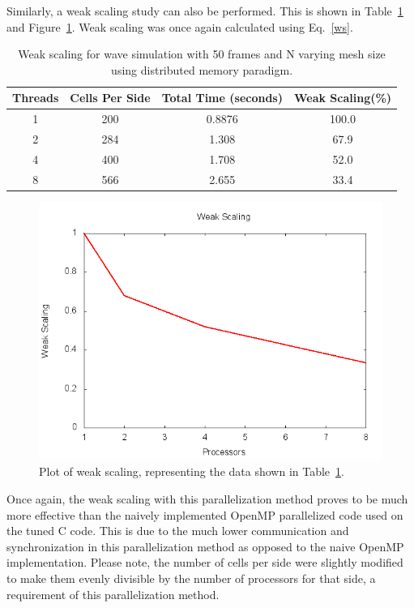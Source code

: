 \documentclass[12pt]{article}
\begin{document}
Similarly, a weak scaling study can also be performed. This is shown in Table~\ref{wscale_c_dist} and Figure~\ref{wsplot_c_dist}. Weak scaling was once again calculated using Eq.~\ref{ws}.


\begin{table}[h]
	\begin{center}
		\begin{tabular}{|c c c c|}
			\hline
			Threads & Cells Per Side & Total Time (seconds) & Weak Scaling(\%) \\ \hline
			1 & 200 & 0.8876 & 100.0   \\ \hline
			2 & 284 & 1.308 &  67.9 \\ \hline
			4 & 400 & 1.708 &  52.0   \\ \hline
			8 & 566 & 2.655 & 33.4   \\ \hline
		\end{tabular}
		\caption{Weak scaling for wave simulation with 50 frames and N varying mesh size using distributed memory paradigm.}
		\label{wscale_c_dist}
	\end{center}
\end{table}

\begin{figure}[h]
	\begin{center}
		\includegraphics[width=0.5\columnwidth]{wsplot_c_dist}
		\caption{Plot of weak scaling, representing the data shown in Table~\ref{wscale_c_dist}.}
		\label{wsplot_c_dist}
	\end{center}
\end{figure}
Once again, the weak scaling with this parallelization method proves to be much more effective than the naively implemented OpenMP parallelized code used on the tuned C code. This is due to the much lower communication and synchronization in this parallelization method as opposed to the naive OpenMP implementation. Please note, the number of cells per side were slightly modified to make them evenly divisible by the number of processors for that side, a requirement of this parallelization method.
\end{document}
